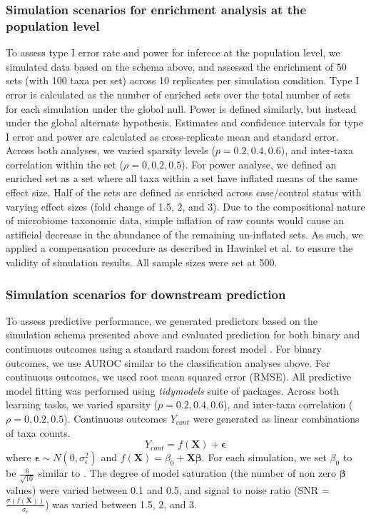 \subsubsection{Simulation scenarios for enrichment analysis at the population level}
To assess type I error rate and power for inferece at the population level, we simulated data based on the schema above, and assessed the enrichment of 50 sets (with 100 taxa per set) across 10 replicates per simulation condition. Type I error is calculated as the number of enriched sets over the total number of sets for each simulation under the global null. Power is defined similarly, but instead under the global alternate hypothesis. Estimates and confidence intervals for type I error and power are calculated as cross-replicate mean and standard error. Across both analyses, we varied sparsity levels ($p = 0.2, 0.4, 0.6$), and inter-taxa correlation within the set ($\rho = 0, 0.2, 0.5$). For power analyse, we defined an enriched set as a set where all taxa within a set have inflated means of the same effect size.  Half of the sets are defined as enriched across case/control status with varying effect sizes (fold change of 1.5, 2, and 3). Due to the compositional nature of microbiome taxonomic data, simple inflation of raw counts would cause an artificial decrease in the abundance of the remaining un-inflated sets. As such, we applied a compensation procedure as described in Hawinkel et al. \cite{hawinkel2019broken} to ensure the validity of simulation results. All sample sizes were set at 500.    

\subsubsection{Simulation scenarios for downstream prediction}
To assess predictive performance, we generated predictors based on the simulation schema presented above and evaluated prediction for both binary and continuous outcomes using a standard random forest model \cite{breiman2001random}. For binary outcomes, we use AUROC similar to the classification analyses above. For continuous outcomes, we used root mean squared error (RMSE). All predictive model fitting was performed using \emph{tidymodels} \cite{kuhn2020tidymodels} suite of packages. Across both learning tasks, we varied sparsity ($p = 0.2, 0.4, 0.6$), and inter-taxa correlation ($\rho = 0, 0.2, 0.5$). Continuous outcomes $Y_{cont}$ were generated as linear combinations of taxa counts.  
\begin{equation}
    Y_{cont} = f(\mathbf{X}) + \mathbf{\epsilon}
\end{equation}
where $\mathbf{\epsilon} \sim N(0, \sigma_{\epsilon}^2)$ and $f(\mathbf{X}) = \beta_0 + \mathbf{X}\mathbf{\beta}$. For each simulation, we set $\beta_0$ to be $\frac{6}{\sqrt{10}}$ similar to \cite{xiao2018phylogenyregularized}. The degree of model saturation (the number of non zero $\mathbf{\beta}$ values) were varied between 0.1 and 0.5, and signal to noise ratio (SNR = $\frac{\sigma(f(\mathbf{X}))}{\sigma_{\epsilon}}$) was varied between 1.5, 2, and 3. 

